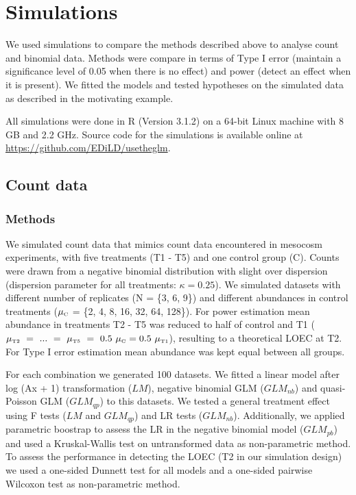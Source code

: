 \documentclass{scrartcl}
\begin{document}
\newpage
\section{Simulations}
We used simulations to compare the methods described above to analyse count and binomial data.
Methods were compare in terms of Type I error (maintain a significance level of 0.05 when there is no effect) and power (detect an effect when it is present). 
We fitted the models and tested hypotheses on the simulated data as described in the motivating example.

All simulations were done in R (Version 3.1.2) \citep{r_core_team_r:_2014} on a 64-bit Linux machine with 8 GB and 2.2 GHz.
Source code for the simulations is available online at \url{https://github.com/EDiLD/usetheglm}. 

\subsection{Count data}
\subsubsection{Methods}
We simulated count data that mimics count data encountered in mesocosm experiments, with five treatments (T1 - T5) and one control group (C).
Counts were drawn from a negative binomial distribution with slight over dispersion (dispersion parameter for all treatments: $\kappa = 0.25$).
We simulated datasets with different number of replicates (N = \{3, 6, 9\}) and different abundances in control treatments ($\mu_\text{\tiny C}$ = \{2, 4, 8, 16, 32, 64, 128\}). 
For power estimation mean abundance in treatments T2 - T5 was reduced to half of control and T1 ($\mu_\text{\tiny T2}~=~...~=~\mu_\text{\tiny T5}~=~0.5~\mu_\text{\tiny C} = 0.5~\mu_\text{\tiny T1}$), resulting to a theoretical LOEC at T2.
For Type I error estimation mean abundance was kept equal between all groups.

For each combination we generated 100 datasets. 
We fitted a linear model after log (Ax + 1) transformation ($LM$), negative binomial GLM ($GLM_{nb}$) and quasi-Poisson GLM ($GLM_{qp}$) to this datasets. 
We tested a general treatment effect using F tests ($LM$ and $GLM_{qp}$) and LR tests ($GLM_{nb}$). Additionally, we applied parametric boostrap to assess the LR in the negative binomial model ($GLM_{pb}$) and used a Kruskal-Wallis test on untransformed data as non-parametric method.
To assess the performance in detecting the LOEC (T2 in our simulation design) we used a one-sided Dunnett test for all models and a one-sided pairwise Wilcoxon test as non-parametric method.
 
\end{document}
